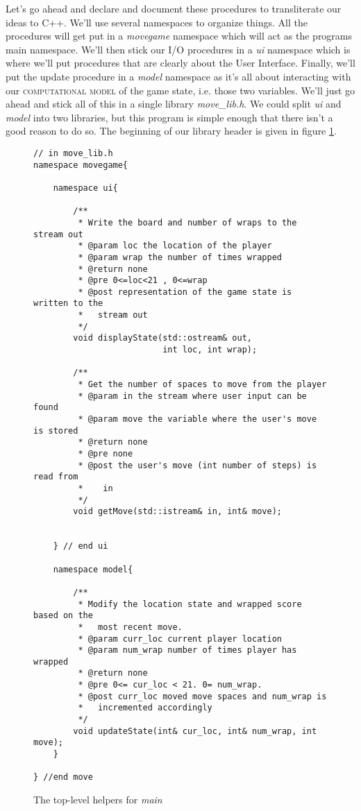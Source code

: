 \documentclass[nobib]{tufte-handout}
\begin{document}
Let's go ahead and declare and document these procedures to transliterate our ideas to C++. We'll use several namespaces to organize things. All the procedures will get put in a \textit{movegame} namespace which will act as the programs main namespace.  We'll then stick our I/O procedures in a \textit{ui} namespace which is where we'll put procedures that are clearly about the User Interface. Finally, we'll put the update procedure in a \textit{model} namespace as it's all about interacting with our \textsc{computational model} of the game state, i.e. those two variables. We'll just go ahead and stick all of this in a single library \textit{move\_lib.h}. We could split \textit{ui} and \textit{model} into two libraries, but this program is simple enough that there isn't a good reason to do so. The beginning of our library header is given in figure \ref{fig:top}.

\begin{figure}[!htbp]
\begin{lstlisting}
// in move_lib.h
namespace movegame{

	namespace ui{
		
		/**
		 * Write the board and number of wraps to the stream out
		 * @param loc the location of the player
		 * @param wrap the number of times wrapped
		 * @return none
		 * @pre 0<=loc<21 , 0<=wrap
		 * @post representation of the game state is written to the
		 *   stream out
		 */
		void displayState(std::ostream& out,
						  int loc, int wrap);

		/**
		 * Get the number of spaces to move from the player
		 * @param in the stream where user input can be found
		 * @param move the variable where the user's move is stored
		 * @return none
		 * @pre none
		 * @post the user's move (int number of steps) is read from
		 *    in
		 */						  
		void getMove(std::istream& in, int& move);		
	
	
	} // end ui

	namespace model{
	
		/**
		 * Modify the location state and wrapped score based on the 
		 *   most recent move.
		 * @param curr_loc current player location
		 * @param num_wrap number of times player has wrapped
		 * @return none
		 * @pre 0<= cur_loc < 21. 0= num_wrap. 
		 * @post curr_loc moved move spaces and num_wrap is 
		 *   incremented accordingly 
		 */
		void updateState(int& cur_loc, int& num_wrap, int move);
	}

} //end move

\end{lstlisting}
\caption{The top-level helpers for \textit{main}}
\label{fig:top}
\end{figure}
\end{document}

